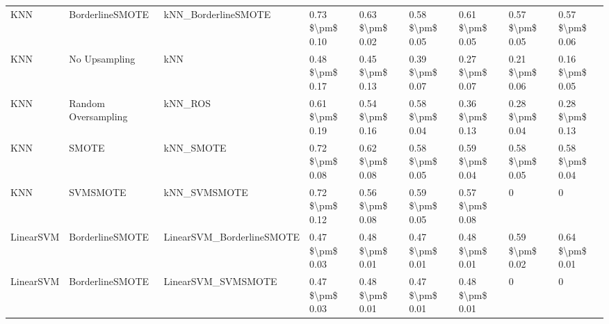 \begin{tabular}{lllllllll}
                            KNN &               BorderlineSMOTE &                          kNN\_BorderlineSMOTE & 0.73 \$\textbackslash pm\$ 0.10 &           0.63 \$\textbackslash pm\$ 0.02 &       0.58 \$\textbackslash pm\$ 0.05 &        0.61 \$\textbackslash pm\$ 0.05 &                         0.57 \$\textbackslash pm\$ 0.05 &     0.57 \$\textbackslash pm\$ 0.06 \\
                            KNN &                 No Upsampling &                                          kNN & 0.48 \$\textbackslash pm\$ 0.17 &           0.45 \$\textbackslash pm\$ 0.13 &       0.39 \$\textbackslash pm\$ 0.07 &        0.27 \$\textbackslash pm\$ 0.07 &                         0.21 \$\textbackslash pm\$ 0.06 &     0.16 \$\textbackslash pm\$ 0.05 \\
                            KNN &           Random Oversampling &                                      kNN\_ROS & 0.61 \$\textbackslash pm\$ 0.19 &           0.54 \$\textbackslash pm\$ 0.16 &       0.58 \$\textbackslash pm\$ 0.04 &        0.36 \$\textbackslash pm\$ 0.13 &                         0.28 \$\textbackslash pm\$ 0.04 &     0.28 \$\textbackslash pm\$ 0.13 \\
                            KNN &                         SMOTE &                                    kNN\_SMOTE & 0.72 \$\textbackslash pm\$ 0.08 &           0.62 \$\textbackslash pm\$ 0.08 &       0.58 \$\textbackslash pm\$ 0.05 &        0.59 \$\textbackslash pm\$ 0.04 &                         0.58 \$\textbackslash pm\$ 0.05 &     0.58 \$\textbackslash pm\$ 0.04 \\
                            KNN &                      SVMSMOTE &                                 kNN\_SVMSMOTE & 0.72 \$\textbackslash pm\$ 0.12 &           0.56 \$\textbackslash pm\$ 0.08 &       0.59 \$\textbackslash pm\$ 0.05 &        0.57 \$\textbackslash pm\$ 0.08 &                                       0 &                   0 \\
                      LinearSVM &               BorderlineSMOTE &                    LinearSVM\_BorderlineSMOTE & 0.47 \$\textbackslash pm\$ 0.03 &           0.48 \$\textbackslash pm\$ 0.01 &       0.47 \$\textbackslash pm\$ 0.01 &        0.48 \$\textbackslash pm\$ 0.01 &                         0.59 \$\textbackslash pm\$ 0.02 &     0.64 \$\textbackslash pm\$ 0.01 \\
                      LinearSVM &               BorderlineSMOTE &                           LinearSVM\_SVMSMOTE & 0.47 \$\textbackslash pm\$ 0.03 &           0.48 \$\textbackslash pm\$ 0.01 &       0.47 \$\textbackslash pm\$ 0.01 &        0.48 \$\textbackslash pm\$ 0.01 &                                       0 &                   0 \\

\end{tabular}
